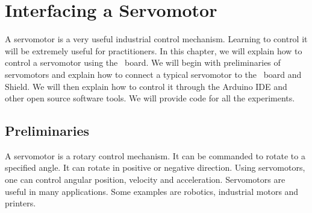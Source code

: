 \chapter {Interfacing a Servomotor}
\thispagestyle{empty}
\label{sec:servo}
\newcommand{\LocSERfig}{\Origin/user-code/servo/figures}
\newcommand{\LocSERscicode}{\Origin/user-code/servo/scilab}
\newcommand{\LocSERscibrief}[1]{{\tt \seqsplit{%
        Origin/user-code/servo/scilab/#1}},
  see \fnrefp{fn:file-loc}}

\newcommand{\LocSERardcode}{\Origin/user-code/servo/arduino}
\newcommand{\LocSERardbrief}[1]{{\tt \seqsplit{%
        Origin/user-code/servo/arduino/#1}},
  see \fnrefp{fn:file-loc}}

\newcommand{\LocSERpycode}{\Origin/user-code/servo/python}
\newcommand{\LocSERpybrief}[1]{{\tt \seqsplit{%
        Origin/user-code/servo/python/#1}},
  see \fnrefp{fn:file-loc}}

\newcommand{\LocSERjuliacode}{\Origin/user-code/servo/julia}
\newcommand{\LocSERjuliabrief}[1]{{\tt \seqsplit{%
        Origin/user-code/servo/julia/#1}},
  see \fnrefp{fn:file-loc}}

\newcommand{\LocSEROpenModelicacode}{\Origin/user-code/servo/OpenModelica}
\newcommand{\LocSEROpenModelicabrief}[1]{{\tt \seqsplit{%
        Origin/user-code/servo/OpenModelica/#1}},
  see \fnrefp{fn:file-loc}}

A servomotor is a very useful industrial control mechanism.  Learning
to control it will be extremely useful for practitioners.  In this
chapter, we will explain how to control a servomotor using the
\arduino\ board.  We will begin with preliminaries of servomotors and
explain how to connect a typical servomotor to the \arduino\ board and
Shield.  We will then explain how to control it through the Arduino IDE and other open source software tools. 
We will provide code for all the experiments.

\section{Preliminaries}
\label{sec:servo-pril}
A servomotor is a rotary control mechanism.  It can be commanded to
rotate to a specified angle.  It can rotate in positive or negative
direction.  Using servomotors, one can control
angular position, velocity and acceleration.  Servomotors are useful
in many applications.  Some examples are robotics, industrial motors
and printers.

